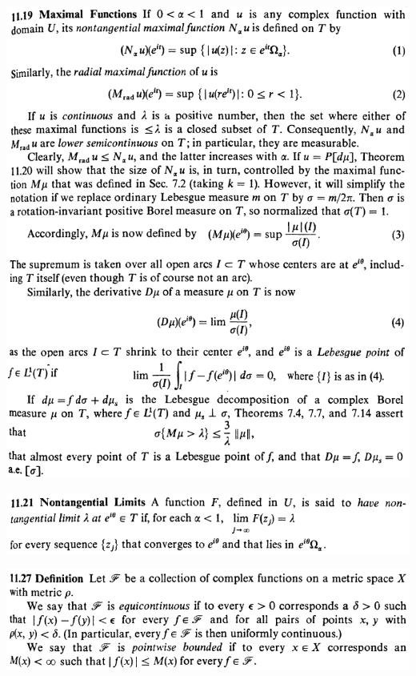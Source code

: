 \documentclass[12pt]{article}
\begin{document}
		\begin{center}
		\includegraphics[scale=0.9]{d11ponto19}
		\end{center}

		\begin{center}
		\includegraphics[scale=0.9]{d11ponto21}
		\end{center}

		\begin{center}
		\includegraphics[scale=0.9]{d11ponto27}
		\end{center}
\end{document}
